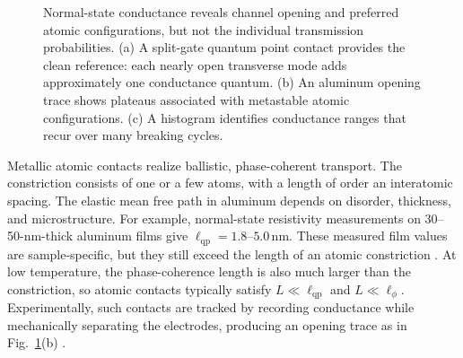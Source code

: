             \begin{figure}
                \centering
                \hfill
                \hfill

                \caption{
                    Normal-state conductance reveals channel opening and preferred atomic configurations, but not the individual transmission probabilities.
                (a) A split-gate quantum point contact provides the clean reference: each nearly open transverse mode adds approximately one conductance quantum.
                (b) An aluminum opening trace shows plateaus associated with metastable atomic configurations.
                (c) A histogram identifies conductance ranges that recur over many breaking cycles.
                }
                \label{fig:quasi:atomic-contact}
            \end{figure}

            Metallic atomic contacts realize ballistic, phase-coherent transport. The constriction consists of one or a few atoms, with a length of order an interatomic spacing. The elastic mean free path in aluminum depends on disorder, thickness, and microstructure. For example, normal-state resistivity measurements on 30--50-nm-thick aluminum films give $\ell_\mathrm{qp}=1.8$--$5.0\,\mathrm{nm}$. These measured film values are sample-specific, but they still exceed the length of an atomic constriction \cite{steinberg_quasi-particle_2008}. At low temperature, the phase-coherence length is also much larger than the constriction, so atomic contacts typically satisfy $L \ll \ell_\mathrm{qp}$ and $L \ll \ell_\phi$. Experimentally, such contacts are tracked by recording conductance while mechanically separating the electrodes, producing an opening trace as in Fig.~\ref{fig:quasi:atomic-contact}(b) \cite{scheer_conduction_1997,agrait_quantum_2003}.

